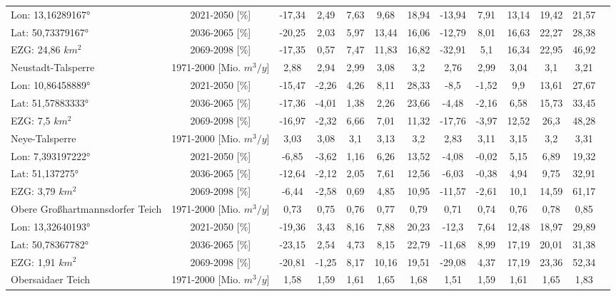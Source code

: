 \begin{longtable}{@{\extracolsep{\fill}}lc|ccccc||cccccc}
\cline{2-13} 
Lon: 13,16289167° & 2021-2050 [\%]  & -17,34 & 2,49 & 7,63 & 9,68 & 18,94 & -13,94 & 7,91 & 13,14 & 19,42 & 21,57 & \\ 
Lat: 50,73379167° & 2036-2065 [\%]  & -20,25 & 2,03 & 5,97 & 13,44 & 16,06 & -12,79 & 8,01 & 16,63 & 22,27 & 28,38 & \\ 
EZG: 24,86 $km^2$ & 2069-2098 [\%]  & -17,35 & 0,57 & 7,47 & 11,83 & 16,82 & -32,91 & 5,1 & 16,34 & 22,95 & 46,92 & \\ 
\hline 
Neustadt-Talsperre & 1971-2000 [Mio. $m^3/y$]  & 2,88 & 2,94 & 2,99 & 3,08 & 3,2 & 2,76 & 2,99 & 3,04 & 3,1 & 3,21 & \\ 
\cline{2-13} 
Lon: 10,86458889° & 2021-2050 [\%]  & -15,47 & -2,26 & 4,26 & 8,11 & 28,33 & -8,5 & -1,52 & 9,9 & 13,61 & 27,67 & \\ 
Lat: 51,57883333° & 2036-2065 [\%]  & -17,36 & -4,01 & 1,38 & 2,26 & 23,66 & -4,48 & -2,16 & 6,58 & 15,73 & 33,45 & \\ 
EZG: 7,5 $km^2$ & 2069-2098 [\%]  & -16,97 & -2,32 & 6,66 & 7,01 & 11,32 & -17,76 & -3,97 & 12,52 & 26,3 & 48,28 & \\ 
\hline 
Neye-Talsperre & 1971-2000 [Mio. $m^3/y$]  & 3,03 & 3,08 & 3,1 & 3,13 & 3,2 & 2,83 & 3,11 & 3,15 & 3,2 & 3,31 & \\ 
\cline{2-13} 
Lon: 7,393197222° & 2021-2050 [\%]  & -6,85 & -3,62 & 1,16 & 6,26 & 13,52 & -4,08 & -0,02 & 5,15 & 6,89 & 19,32 & \\ 
Lat: 51,137275° & 2036-2065 [\%]  & -12,64 & -2,12 & 2,05 & 7,61 & 12,56 & -6,03 & -0,38 & 4,94 & 9,75 & 32,91 & \\ 
EZG: 3,79 $km^2$ & 2069-2098 [\%]  & -6,44 & -2,58 & 0,69 & 4,85 & 10,95 & -11,57 & -2,61 & 10,1 & 14,59 & 61,17 & \\ 
\hline 
Obere Großhartmannsdorfer Teich & 1971-2000 [Mio. $m^3/y$]  & 0,73 & 0,75 & 0,76 & 0,77 & 0,79 & 0,71 & 0,74 & 0,76 & 0,78 & 0,85 & \\ 
\cline{2-13} 
Lon: 13,32640193° & 2021-2050 [\%]  & -19,36 & 3,43 & 8,16 & 7,88 & 20,23 & -12,3 & 7,64 & 12,48 & 18,97 & 29,89 & \\ 
Lat: 50,78367782° & 2036-2065 [\%]  & -23,15 & 2,54 & 4,73 & 8,15 & 22,79 & -11,68 & 8,99 & 17,19 & 20,01 & 31,38 & \\ 
EZG: 1,91 $km^2$ & 2069-2098 [\%]  & -20,81 & -1,25 & 8,17 & 10,16 & 19,51 & -29,08 & 4,37 & 17,19 & 23,36 & 52,34 & \\ 
\hline 
Obersaidaer Teich & 1971-2000 [Mio. $m^3/y$]  & 1,58 & 1,59 & 1,61 & 1,65 & 1,68 & 1,51 & 1,59 & 1,61 & 1,65 & 1,83 & \\ 

\end{longtable}
